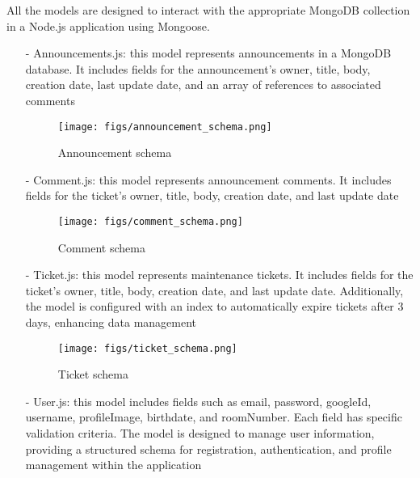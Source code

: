 \documentclass[conference]{IEEEtran}
\begin{document}
\begin{enumerate}
\begin{enumerate}
            All the models are designed to interact with the appropriate MongoDB collection in a Node.js application using Mongoose.
                \begin{itemize}
                    \item[-] Announcements.js: this model represents announcements in a MongoDB database. It includes fields for the announcement's owner, title, body, creation date, last update date, and an array of references to associated comments
                    \begin{figure}[H]
                    \centering
                    \texttt{[image: figs/announcement\_schema.png]}
                    \caption{Announcement schema}
                    \label{fig:Announcement Schema}
                    \end{figure}
                    \item[-] Comment.js: this model represents announcement comments. It includes fields for the ticket's owner, title, body, creation date, and last update date
                    \begin{figure}[H]
                    \centering
                    \texttt{[image: figs/comment\_schema.png]}
                    \caption{Comment schema}
                    \label{fig:Comment Schema}
                    \end{figure}
                    \item[-] Ticket.js: this model represents maintenance tickets. It includes fields for the ticket's owner, title, body, creation date, and last update date. Additionally, the model is configured with an index to automatically expire tickets after 3 days, enhancing data management
                    \begin{figure}[H]
                    \centering
                    \texttt{[image: figs/ticket\_schema.png]}
                    \caption{Ticket schema}
                    \label{fig:Ticket Schema}
                    \end{figure}
                    \item[-] User.js: this model includes fields such as email, password, googleId, username, profileImage, birthdate, and roomNumber. Each field has specific validation criteria. The model is designed to manage user information, providing a structured schema for registration, authentication, and profile management within the application
                    \begin{figure}[H]
                    \centering

\end{figure}
\end{itemize}
\end{enumerate}
\end{enumerate}
\end{document}
